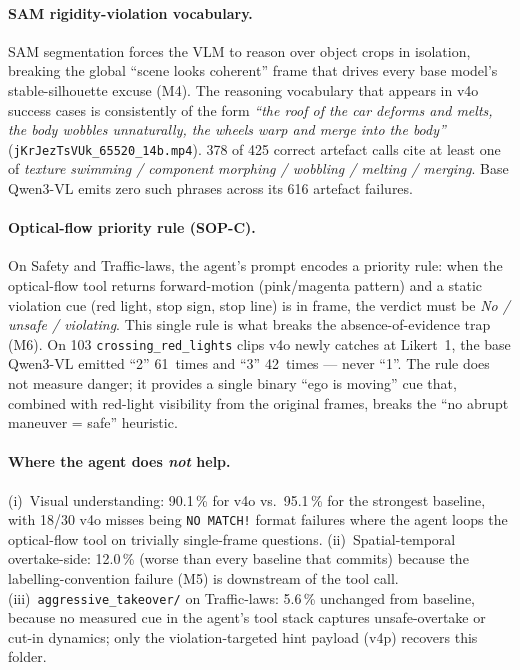 \documentclass[11pt,a4paper]{article}
\newcommand{\pct}[1]{#1\,\%}
\newcommand{\code}[1]{\texttt{#1}}
\begin{document}
\paragraph{SAM rigidity-violation vocabulary.} SAM segmentation forces
the VLM to reason over object crops in isolation, breaking the global
``scene looks coherent'' frame that drives every base model's
stable-silhouette excuse (M4). The reasoning vocabulary that appears
in v4o success cases is consistently of the form \emph{``the roof of
the car deforms and melts, the body wobbles unnaturally, the wheels
warp and merge into the body''}
(\code{jKrJezTsVUk\_65520\_14b.mp4}). 378 of 425 correct artefact
calls cite at least one of \emph{texture swimming /
component morphing / wobbling / melting / merging}. Base Qwen3-VL
emits zero such phrases across its 616 artefact failures.

\paragraph{Optical-flow priority rule (SOP-C).} On Safety and
Traffic-laws, the agent's prompt encodes a priority rule: when the
optical-flow tool returns forward-motion (pink/magenta pattern) and a
static violation cue (red light, stop sign, stop line) is in frame, the
verdict must be \emph{No / unsafe / violating}. This single rule is what
breaks the absence-of-evidence trap (M6). On 103
\code{crossing\_red\_lights} clips v4o newly catches at Likert~1, the
base Qwen3-VL emitted ``2'' 61~times and ``3'' 42~times --- never
``1''. The rule does not measure danger; it provides a single
binary ``ego is moving'' cue that, combined with red-light visibility
from the original frames, breaks the ``no abrupt maneuver = safe''
heuristic.

\paragraph{Where the agent does \emph{not} help.} (i)~Visual
understanding: \pct{90.1} for v4o vs.~\pct{95.1} for the strongest
baseline, with 18/30 v4o misses being \code{NO MATCH!} format failures
where the agent loops the optical-flow tool on trivially
single-frame questions. (ii)~Spatial-temporal overtake-side:
\pct{12.0} (worse than every baseline that commits) because the
labelling-convention failure (M5) is downstream of the tool call.
(iii)~\code{aggressive\_takeover/} on Traffic-laws: \pct{5.6} unchanged
from baseline, because no measured cue in the agent's tool stack
captures unsafe-overtake or cut-in dynamics; only the violation-targeted
hint payload (v4p) recovers this folder.
\end{document}
